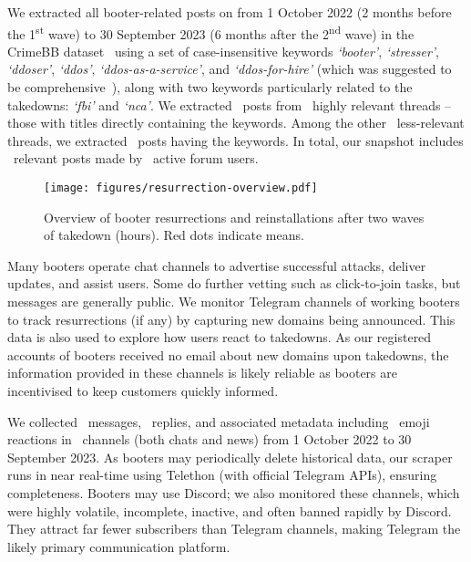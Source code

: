 \documentclass[letterpaper,twocolumn,10pt]{article}
\begin{document}
We extracted all booter-related posts on \hackforums from 1 October 2022 (2 months before the 1\textsuperscript{st} wave) to 30 September 2023 (6 months after the 2\textsuperscript{nd} wave) in the CrimeBB dataset~\cite{pastrana2018crimebb} using a set of case-insensitive keywords \textit{`booter'}, \textit{`stresser'}, \textit{`ddoser'}, \textit{`ddos'}, \textit{`ddos-as-a-service'}, and \textit{`ddos-for-hire'} (which was suggested to be comprehensive~\cite{santanna2015booters}), along with two keywords particularly related to the takedowns: \textit{`fbi'} and \textit{`nca'}. We extracted \BTnHighlyRelevantPosts~posts from \BTnHighlyRelevantThreads~highly relevant threads -- those with titles directly containing the keywords. Among the other \BTnLowerRelevantThreads~less-relevant threads, we extracted \BTnLowerRelevantPosts~posts having the keywords. In total, our snapshot includes \BTnAllRelevantPosts~relevant posts made by \BTnAllRelevantUsers~active forum users.

\begin{figure}[t]
    \centering
    \texttt{[image: figures/resurrection-overview.pdf]}\\
    \caption{Overview of booter resurrections and reinstallations after two waves of takedown (hours). Red dots indicate means.}
    \label{fig:takedown-overview}
\end{figure}
 Many booters operate chat channels to advertise successful attacks, deliver updates, and assist users. Some do further vetting such as click-to-join tasks, but messages are generally public. We monitor Telegram channels of working booters to track resurrections (if any) by capturing new domains being announced. This data is also used to explore how users react to takedowns. As our registered accounts of booters received no email about new domains upon takedowns, the information provided in these channels is likely reliable as booters are incentivised to keep customers quickly informed. 

We collected \BTnTelegramMessages~messages, \BTnTelegramReplies~replies, and associated metadata including \BTnTelegramEmojis~emoji reactions in \BTnCollectedTelegramChannels~channels (both chats and news) from 1 October 2022 to 30 September 2023. As booters may periodically delete historical data, our scraper runs in near real-time using Telethon (with official Telegram APIs), ensuring completeness. Booters may use Discord; we also monitored these channels, which were highly volatile, incomplete, inactive, and often banned rapidly by Discord. They attract far fewer subscribers than Telegram channels, making Telegram the likely primary communication platform.
\end{document}

